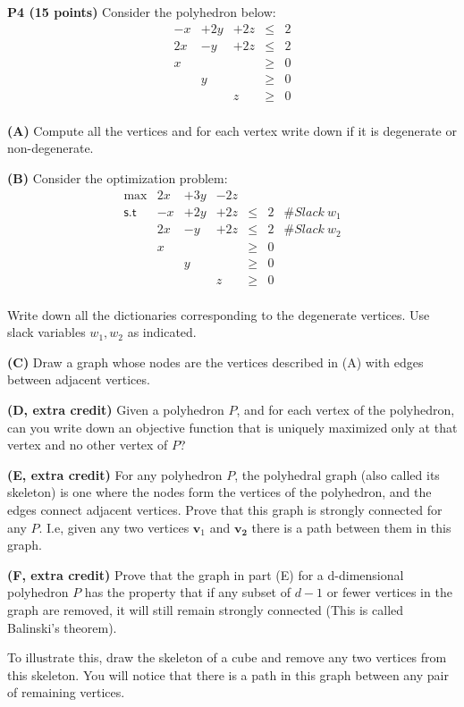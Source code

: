 \documentclass[11pt]{article}
\begin{document}
\bigskip

\noindent\textbf{P4 (15 points)}  Consider the polyhedron below:
\[ \begin{array}{ccccc}
 -x & + 2 y & + 2z & \leq & 2 \\
2 x & - y & + 2z & \leq & 2 \\
x & & & \geq & 0\\
& y& & \geq & 0 \\
& & z & \geq & 0 \\
\end{array}\]

\noindent\textbf{(A)} Compute all the vertices and for each vertex
write down if it is degenerate or non-degenerate.

\noindent\textbf{(B)} Consider the optimization problem:
\[ \begin{array}{rcccccc}
\max & 2x & + 3y & - 2z \\
\mathsf{s.t} &  -x & + 2 y & + 2z & \leq & 2 & \# Slack\ w_1\\
& 2 x & - y & + 2z & \leq & 2 & \# Slack\ w_2\\
& x & & & \geq & 0\\
& & y& & \geq & 0 \\
& & & z & \geq & 0 \\
\end{array}\]

Write down all the dictionaries corresponding to the degenerate
vertices. Use slack variables $w_1, w_2$ as indicated.

\noindent\textbf{(C)} Draw a graph whose nodes are the vertices
described in (A) with edges between adjacent vertices. 

\medskip

\noindent\textbf{(D, extra credit)} Given a polyhedron $P$, and for
each vertex of the polyhedron,  can you  write down an
objective function that is uniquely maximized only at that vertex and
no other vertex of $P$? 


\medskip

\noindent\textbf{(E, extra credit)} For any polyhedron $P$, the
polyhedral graph (also called its skeleton) is one where the nodes
form the vertices of the polyhedron, and the edges connect adjacent
vertices. Prove that this graph is strongly connected for any
$P$. I.e, given any two vertices $\mathbf{v}_1$ and $\mathbf{v_2}$
there is a path between them in this graph.

\medskip

\noindent\textbf{(F, extra credit)}  Prove that the graph in part (E)
for a d-dimensional polyhedron $P$ has the property that if any subset
of $d-1$ or fewer vertices in the graph are removed, it will still
remain strongly connected (This is called Balinski's theorem).

To illustrate this, draw the skeleton of a cube and remove any two
vertices from this skeleton. You will notice that there is a path in
this graph between any pair of remaining vertices.
\end{document}
